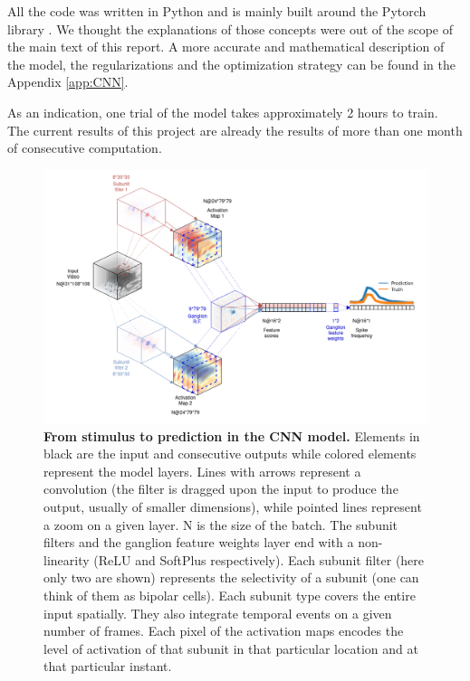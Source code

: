 All the code was written in Python and is mainly built around the Pytorch
library \citep{paszke_pytorch_2019}.
We thought the explanations of those concepts were out of the scope of the main
text of this report. A more accurate and mathematical description of the model,
the regularizations and the optimization strategy can be found in the Appendix
\ref{app:CNN}.

As an indication, one trial of the model takes approximately 2 hours to train.
The current results of this project are already the results of more than one
month of consecutive computation.

\begin{figure}
    \centering
    \includegraphics[width=\textwidth]{pics/CNNSimpleWithImgs.png}
    \caption{\textbf{From stimulus to prediction in the CNN model.} Elements in
        black are the input and consecutive outputs while colored
        elements
        represent the model layers. Lines with arrows represent a convolution
        (the
        filter is dragged upon the input to produce the output, usually of
        smaller
        dimensions), while pointed lines represent a zoom on a given layer. N
        is the size of the batch. The subunit filters and the ganglion feature
        weights layer end
        with a non-linearity (ReLU and SoftPlus respectively).
        Each subunit filter (here only two are shown) represents the
        selectivity
        of a subunit (one can think of them as bipolar cells). Each subunit
        type covers the entire input spatially. They also integrate temporal
        events on a given number of frames. Each pixel of the
        activation maps encodes the level of activation of that subunit in that
        particular location and at that particular instant.
}
\end{figure}
